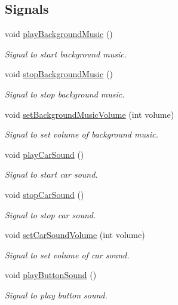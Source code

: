 \subsection*{Signals}
\begin{DoxyCompactItemize}
\item 
void \mbox{\hyperlink{classmain_menu_afd6149b5864c75c9b64b56b59aeff63d}{play\+Background\+Music}} ()
\begin{DoxyCompactList}\small\item\em Signal to start background music. \end{DoxyCompactList}\item 
void \mbox{\hyperlink{classmain_menu_a75974a4205260cb8ae09f7c7b19fee0f}{stop\+Background\+Music}} ()
\begin{DoxyCompactList}\small\item\em Signal to stop background music. \end{DoxyCompactList}\item 
void \mbox{\hyperlink{classmain_menu_a8d2ff09cb3152199cb875090bdf94df1}{set\+Background\+Music\+Volume}} (int volume)
\begin{DoxyCompactList}\small\item\em Signal to set volume of background music. \end{DoxyCompactList}\item 
void \mbox{\hyperlink{classmain_menu_ae546b1a2986ffe574f5e90d66f16f7b1}{play\+Car\+Sound}} ()
\begin{DoxyCompactList}\small\item\em Signal to start car sound. \end{DoxyCompactList}\item 
void \mbox{\hyperlink{classmain_menu_ad797f58e348ef99487d50084e9366887}{stop\+Car\+Sound}} ()
\begin{DoxyCompactList}\small\item\em Signal to stop car sound. \end{DoxyCompactList}\item 
void \mbox{\hyperlink{classmain_menu_ac85de7f3210a2b60d19bd2100e13bd06}{set\+Car\+Sound\+Volume}} (int volume)
\begin{DoxyCompactList}\small\item\em Signal to set volume of car sound. \end{DoxyCompactList}\item 
void \mbox{\hyperlink{classmain_menu_a611ea90dd139e55b4c73df84ea16b5ee}{play\+Button\+Sound}} ()
\begin{DoxyCompactList}\small\item\em Signal to play button sound. \end{DoxyCompactList}\item 

\end{DoxyCompactItemize}
